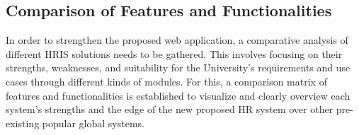 


    \subsection{Comparison of Features and Functionalities}
    In order to strengthen the proposed web application, a comparative analysis of different HRIS solutions needs to be gathered. This involves focusing on their strengths, weaknesses, and suitability for the University's requirements and use cases through different kinds of modules. For this, a comparison matrix of features and functionalities is established to visualize and clearly overview each system's strengths and the edge of the new proposed HR system over other pre-existing popular global systems.
    
